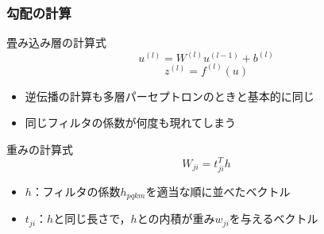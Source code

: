\documentclass[dvipdfmx,11pt,notheorems]{beamer}
\theoremstyle{definition}
\begin{document}

\begin{frame}[fragile]\frametitle{勾配の計算}

 \begin{block}{畳み込み層の計算式}
  \begin{equation}
   u^{(l)} = W^{(l)} u^{(l-1)} + b^{(l)}
  \end{equation}
  \begin{equation}
   z^{(l)} = f^{(l)} (u)
  \end{equation}
 \end{block}

 \begin{itemize}
  \item 逆伝播の計算も多層パーセプトロンのときと基本的に同じ
  \item 同じフィルタの係数が何度も現れてしまう
 \end{itemize}

 \begin{block}{重みの計算式}
  \begin{equation}
   W_{ji} = t_{ji}^{T} h
  \end{equation}
 \end{block}

 \begin{itemize}
  \item $h$：フィルタの係数$h_{pqkm}$を適当な順に並べたベクトル
  \item $t_{ji}$：$h$と同じ長さで，$h$との内積が重み$w_{ji}$を与えるベクトル
 \end{itemize}

\end{frame}
\end{document}
